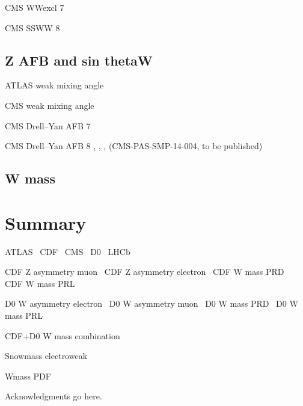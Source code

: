 \documentclass[12pt]{iopart}
\begin{document}
CMS WWexcl 7 \TeV~\cite{Chatrchyan:2013foa}

CMS SSWW 8 \TeV~\cite{Khachatryan:2014sta}

\subsection{Z AFB and sin thetaW}

ATLAS weak mixing angle~\cite{Aad:2015uau}

CMS weak mixing angle~\cite{Chatrchyan:2011ya}

CMS Drell--Yan AFB 7 \TeV~\cite{Chatrchyan:2012dc}

CMS Drell--Yan AFB 8 \TeV, \gz, \kz, \lz (CMS-PAS-SMP-14-004, to be published)

\subsection{W mass}

\section{Summary}


ATLAS~\cite{Aad:2008zzm}
CDF~\cite{Abulencia:2005ix}
CMS~\cite{CMSdetector}
D0~\cite{Abazov:2005pn}
LHCb~\cite{Alves:2008zz}

CDF Z asymmetry muon~\cite{Aaltonen:2014loa}
CDF Z asymmetry electron~\cite{Aaltonen:2013wcp}
CDF W mass PRD~\cite{Aaltonen:2013vwa}
CDF W mass PRL~\cite{Aaltonen:2012bp}

D0 W asymmetry electron~\cite{Abazov:2013dsa}
D0 W asymmetry muon~\cite{Abazov:2013rja}
D0 W mass PRD~\cite{D0:2013jba}
D0 W mass PRL~\cite{Abazov:2012bv}

CDF+D0 W mass combination~\cite{Aaltonen:2013iut}

Snowmass electroweak~\cite{Baak:2013fwa}

Wmass PDF~\cite{Bozzi:2011ww}

\ack
Acknowledgments go here. 



\end{document}
